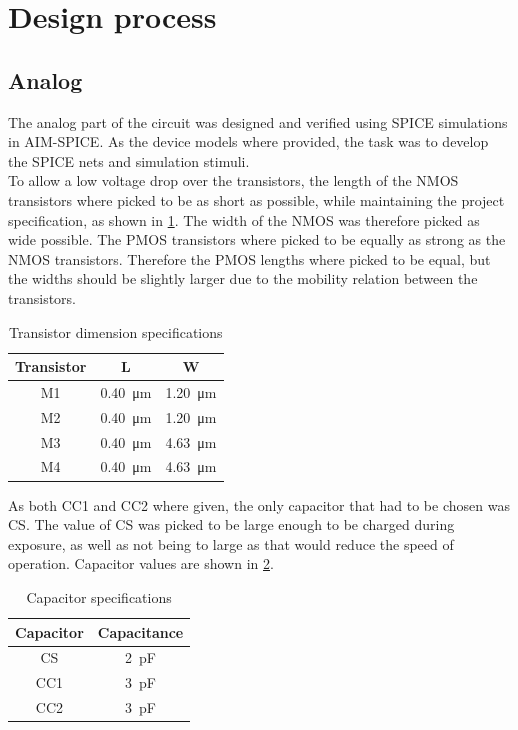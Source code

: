 \section{Design process}
\subsection{Analog}
The analog part of the circuit was designed and verified using SPICE simulations in  AIM-SPICE. 
As the device models where provided, the task was to develop the SPICE nets and simulation stimuli.\\
To allow a low voltage drop over the transistors, the length of the NMOS transistors where picked to be as short as possible, while maintaining the project specification, as shown in \cref{tab:trans}. 
The width of the NMOS was therefore picked as wide possible. 
The PMOS transistors where picked to be equally as strong as the NMOS transistors. 
Therefore the PMOS lengths where picked to be equal, but the widths should be slightly larger due to the mobility relation between the transistors.

\begin{table}[!htbp]
    \centering
    \begin{tabular}{c|c|c}
        Transistor & L  & W \\\hline
        M1 & \SI{0.40}{\micro\meter} & \SI{1.20}{\micro\meter} \\
        M2 & \SI{0.40}{\micro\meter} & \SI{1.20}{\micro\meter} \\
        M3 & \SI{0.40}{\micro\meter} & \SI{4.63}{\micro\meter} \\ 
        M4 & \SI{0.40}{\micro\meter} & \SI{4.63}{\micro\meter}
    \end{tabular}
    \caption{Transistor dimension specifications}
    \label{tab:trans}
\end{table}

As both CC1 and CC2 where given, the only capacitor that had to be chosen was CS. The value of CS was picked to be large enough to be charged during exposure, as well as not being to large as that would reduce the speed of operation. Capacitor values are shown in \cref{tab:caps}.

\begin{table}[!htbp]
    \centering
    \begin{tabular}{c|c}
        Capacitor & Capacitance \\\hline
        CS  & \SI{2}{\pico\farad} \\
        CC1 & \SI{3}{\pico\farad} \\
        CC2 & \SI{3}{\pico\farad}
    \end{tabular}
    \caption{Capacitor specifications}
    \label{tab:caps}
\end{table}

